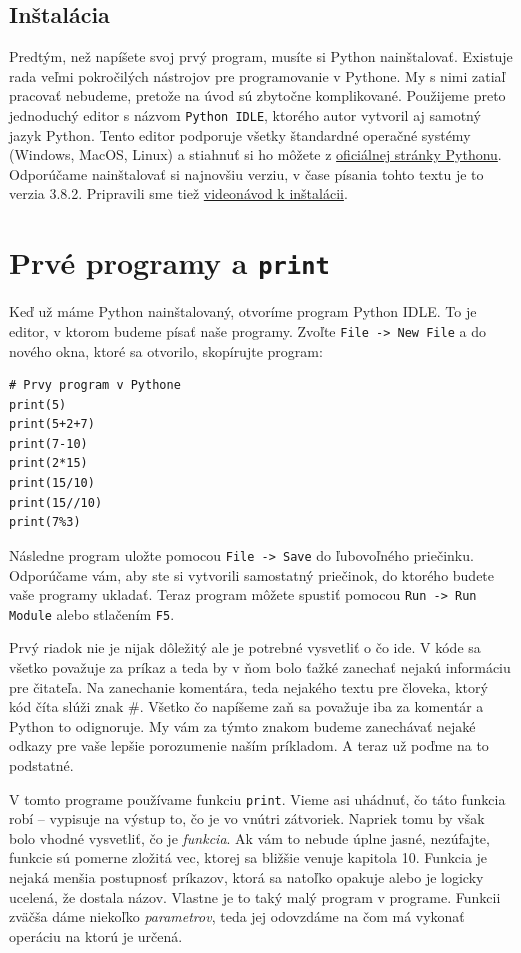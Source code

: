\documentclass{article}
\begin{document}
\subsection{Inštalácia}
Predtým, než napíšete svoj prvý program, musíte si Python nainštalovať. Existuje rada veľmi pokročilých nástrojov pre programovanie v Pythone. My s nimi zatiaľ pracovať nebudeme, pretože na úvod sú zbytočne komplikované.
Použijeme preto jednoduchý editor s názvom \texttt{Python IDLE}, ktorého autor vytvoril aj samotný jazyk Python. Tento editor podporuje všetky štandardné operačné systémy (Windows, MacOS, Linux) a stiahnuť si ho môžete z \href{https://www.python.org/downloads/}{oficiálnej stránky Pythonu}. Odporúčame nainštalovať si najnovšiu verziu, v čase písania tohto textu je to verzia 3.8.2. Pripravili sme tiež \href{https://www.youtube.com/watch?v=_oLcUfkgxSI}{videonávod k inštalácii}.

\section{Prvé programy a \texttt{print}}
Keď už máme Python nainštalovaný, otvoríme program Python IDLE. To je editor, v ktorom budeme písať naše programy. Zvoľte \texttt{File -> New File} a do nového okna, ktoré sa otvorilo, skopírujte program:
\begin{lstlisting}
# Prvy program v Pythone
print(5)
print(5+2+7)
print(7-10)
print(2*15)
print(15/10)
print(15//10)
print(7%3)
\end{lstlisting}
Následne program uložte pomocou \texttt{File -> Save} do ľubovoľného priečinku. Odporúčame vám, aby ste si vytvorili samostatný priečinok, do ktorého budete vaše programy ukladať. Teraz program môžete spustiť pomocou \texttt{Run -> Run Module} alebo stlačením \texttt{F5}. 

Prvý riadok nie je nijak dôležitý ale je potrebné vysvetliť o čo ide. V kóde sa všetko považuje za príkaz a teda by v ňom bolo ťažké zanechať nejakú informáciu pre čitateľa. Na zanechanie komentára, teda nejakého textu pre človeka, ktorý kód číta slúži znak $\#$. Všetko čo napíšeme zaň sa považuje iba za komentár a Python to odignoruje. My vám za týmto znakom budeme zanechávať nejaké odkazy pre vaše lepšie porozumenie naším príkladom. A teraz už poďme na to podstatné.

V tomto programe používame funkciu \texttt{print}. Vieme asi uhádnuť, čo táto funkcia robí -- vypisuje na výstup to, čo je vo vnútri zátvoriek. Napriek tomu by však bolo vhodné vysvetliť, čo je \textit{funkcia}. Ak vám to nebude úplne jasné, nezúfajte, funkcie sú pomerne zložitá vec, ktorej sa bližšie venuje kapitola 10.
Funkcia je nejaká menšia postupnosť príkazov, ktorá sa natoľko opakuje alebo je logicky ucelená, že dostala názov. Vlastne je to taký malý program v programe. Funkcii zväčša dáme niekoľko \textit{parametrov}, teda jej odovzdáme na čom má vykonať operáciu na ktorú je určená.
\end{document}
